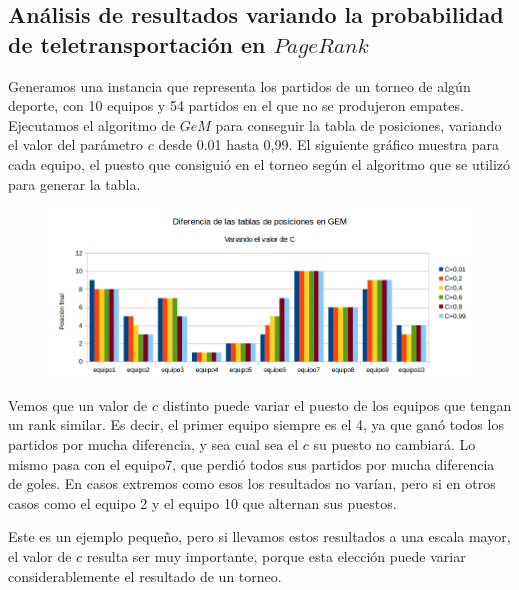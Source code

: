 \subsection{Análisis de resultados variando la probabilidad de teletransportación en $PageRank$}

Generamos una instancia que representa los partidos de un torneo de algún deporte, con 10 equipos y 54 partidos en el que no se produjeron empates. Ejecutamos el algoritmo de $GeM$ para conseguir la tabla de posiciones, variando el valor del parámetro $c$ desde 0.01 hasta 0,99. El siguiente gráfico muestra para cada equipo, el puesto que consiguió en el torneo según el algoritmo que se utilizó para generar la tabla.\\



\begin{figure}[H]
\centering
\includegraphics[width=0.7\linewidth]{imagenes/variacionDeTablaGEM.png}
\end{figure}


Vemos que un valor de $c$ distinto puede variar el puesto de los equipos que tengan un rank similar. Es decir, el primer equipo siempre es el 4, ya que ganó todos los partidos por mucha diferencia, y sea cual sea el $c$ su puesto no cambiará. Lo mismo pasa con el equipo7, que perdió todos sus partidos por mucha diferencia de goles. En casos extremos como esos los resultados no varían, pero si en otros casos como el equipo 2 y el equipo 10 que alternan sus puestos.

Este es un ejemplo pequeño, pero si llevamos estos resultados a una escala mayor, el valor de $c$ resulta ser muy importante, porque esta elección puede variar considerablemente el resultado de un torneo.\\
